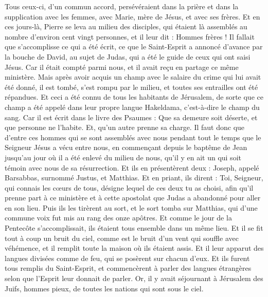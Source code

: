 \begin{multicols}{2}
Tous ceux-ci, d'un commun accord, persévéraient dans la prière et dans la supplication avec les femmes, avec Marie, mère de Jésus, et avec ses frères.
Et en ces jours-là, Pierre se leva au milieu des disciples, qui étaient là assemblés au nombre d'environ cent vingt personnes, et il leur dit :
Hommes frères ! Il fallait que s'accomplisse ce qui a été écrit, ce que le Saint-Esprit a annoncé d'avance par la bouche de David, au sujet de Judas, qui a été le guide de ceux qui ont saisi Jésus.
Car il était compté parmi nous, et il avait reçu en partage ce même ministère.
Mais après avoir acquis un champ avec le salaire du crime qui lui avait été donné, il est tombé, s'est rompu par le milieu, et toutes ses entrailles ont été répandues.
Et ceci a été connu de tous les habitants de Jérusalem, de sorte que ce champ a été appelé dans leur propre langue Hakeldama, c'est-à-dire le champ du sang.
Car il est écrit dans le livre des Psaumes : Que sa demeure soit déserte, et que personne ne l'habite. Et, qu'un autre prenne sa charge.
Il faut donc que d'entre ces hommes qui se sont assemblés avec nous pendant tout le temps que le Seigneur Jésus a vécu entre nous,
en commençant depuis le baptême de Jean jusqu'au jour où il a été enlevé du milieu de nous, qu'il y en ait un qui soit témoin avec nous de sa résurrection.
Et ils en présentèrent deux : Joseph, appelé Barsabbas, surnommé Justus, et Matthias.
Et en priant, ils dirent : Toi, Seigneur, qui connais les cœurs de tous, désigne lequel de ces deux tu as choisi,
afin qu'il prenne part à ce ministère et à cette apostolat que Judas a abandonné pour aller en son lieu.
Puis ils les tirèrent au sort, et le sort tomba sur Matthias, qui d'une commune voix fut mis au rang des onze apôtres.
\VerseOne{}Et comme le jour de la Pentecôte s'accomplissait, ils étaient tous ensemble dans un même lieu.
Et il se fit tout à coup un bruit du ciel, comme est le bruit  d'un vent qui souffle avec véhémence, et il remplit toute la maison où ils étaient assis.
Et il leur apparut des langues divisées comme de feu, qui se posèrent sur chacun d'eux.
Et ils furent tous remplis du Saint-Esprit, et commencèrent à parler des langues étrangères selon que l'Esprit leur donnait de parler.
Or, il y avait séjournant à Jérusalem des Juifs, hommes pieux, de toutes les nations qui sont sous le ciel.

\end{multicols}

